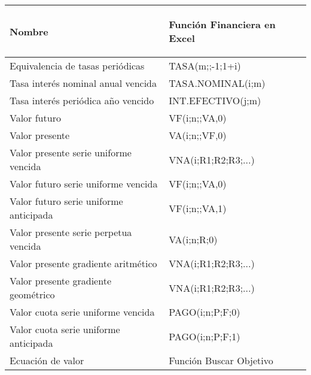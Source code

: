 \vspace{2cm}

\begin{spacing}{1}
	\begin{center}
		\begin{tabular}{ |p{7cm}|p{5.5cm}|}
			\hline
			\rowcolor{orange!50}
			
			\begin{center}\textbf{Nombre} \end{center}             & \begin{center} \textbf{Función Financiera en Excel} \end{center} \\ \hline
			
			Equivalencia de tasas periódicas       & TASA(m;;-1;1+i)            \\\hline
			
			Tasa interés nominal anual vencida     & TASA.NOMINAL(i;m)          \\ \hline
			
			Tasa interés periódica año vencido     & INT.EFECTIVO(j;m)          \\ \hline
			
			Valor futuro                           & VF(i;n;;VA,0)              \\ \hline
			
			Valor presente                         & VA(i;n;;VF,0)              \\ \hline
			
			Valor presente serie uniforme vencida  & VNA(i;R1;R2;R3;...)        \\ \hline
			
			Valor futuro serie uniforme vencida    & VF(i;n;;VA,0)              \\ \hline
			
			Valor futuro serie uniforme anticipada & VF(i;n;;VA,1)              \\ \hline
			
			Valor presente serie perpetua vencida  & VA(i;n;R;0)                \\ \hline
			
			Valor presente gradiente aritmético    & VNA(i;R1;R2;R3;...)        \\ \hline
			
			Valor presente gradiente geométrico    & VNA(i;R1;R2;R3;...)        \\ \hline
			
			Valor cuota serie uniforme vencida     & PAGO(i;n;P;F;0)            \\ \hline
			
			Valor cuota serie uniforme anticipada  & PAGO(i;n;P;F;1)            \\ \hline
			
			Ecuación de valor                      & Función Buscar Objetivo    \\ \hline
		\end{tabular}
	\end{center}
\end{spacing}

\clearpage
